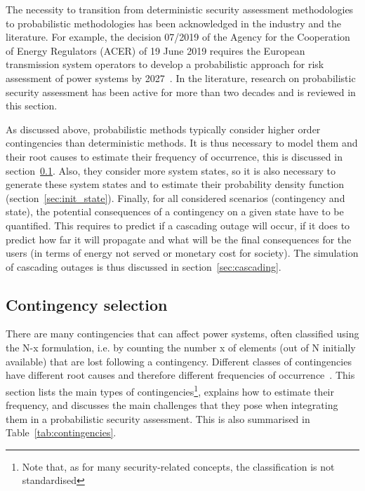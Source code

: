 The necessity to transition from deterministic security assessment methodologies to probabilistic methodologies has been acknowledged in the industry and the literature. For example, the decision 07/2019 of the Agency for the Cooperation of Energy Regulators (ACER) of 19 June 2019 requires the European transmission system operators to develop a probabilistic approach for risk assessment of power systems by 2027~\cite{ACER}. In the literature, research on probabilistic security assessment has been active for more than two decades and is reviewed in this section.

As discussed above, probabilistic methods typically consider higher order contingencies than deterministic methods. It is thus necessary to model them and their root causes to estimate their frequency of occurrence, this is discussed in section~\ref{sec:contingencies}. Also, they consider more system states, so it is also necessary to generate these system states and to estimate their probability density function (section~\ref{sec:init_state}). Finally, for all considered scenarios (contingency and state), the potential consequences of a contingency on a given state have to be quantified. This requires to predict if a cascading outage will occur, if it does to predict how far it will propagate and what will be the final consequences for the users (in terms of energy not served or monetary cost for society). The simulation of cascading outages is thus discussed in section~\ref{sec:cascading}.

\subsection{Contingency selection}
\label{sec:contingencies}

There are many contingencies that can affect power systems, often classified using the N-x formulation, i.e. by counting the number x of elements (out of N initially available) that are lost following a contingency. Different classes of contingencies have different root causes and therefore different frequencies of occurrence~\cite{ContingencyTypes}. This section lists the main types of contingencies\footnote{Note that, as for many security-related concepts, the classification is not standardised}, explains how to estimate their frequency, and discusses the main challenges that they pose when integrating them in a probabilistic security assessment. This is also summarised in Table~\ref{tab:contingencies}.


